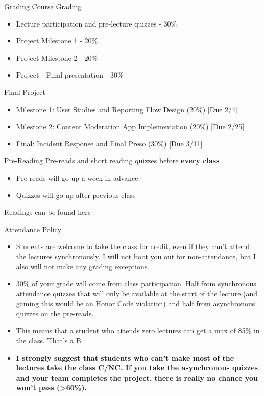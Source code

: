 \documentclass[nobackground,dvipsnames,table]{beamer}
\begin{document}
\begin{frame}{Grading}
    Course Grading
    \begin{itemize}
        \item Lecture participation and pre-lecture quizzes - 30\%
        \item Project Milestone 1 - 20\%
        \item Project Milestone 2 - 20\%
        \item Project - Final presentation - 30\% \newline
    \end{itemize}
    
    Final Project
    \begin{itemize}
        \item Milestone 1: User Studies and Reporting Flow Design (20\%) [Due 2/4]
        \item Milestone 2: Content Moderation App Implementation (20\%) [Due 2/25]
        \item Final:  Incident Response and Final Preso (30\%) [Due 3/11]
    \end{itemize}
\end{frame}

\begin{frame}{Pre-Reading}
    Pre-reads and short reading quizzes before \bfseries every \mdseries class
    \begin{itemize}
        \item Pre-reads will go up a week in advance
        \item Quizzes will go up after previous class
    \end{itemize}
    Readings can be found here %
\end{frame}

\begin{frame}{Attendance Policy}
    \begin{itemize}
        \item Students are welcome to take the class for credit, even if they can't attend the lectures synchronously. I will not boot you out for non-attendance, but I also will not make any grading exceptions.
        \item 30\% of your grade will come from class participation. Half from synchronous attendance quizzes that will only be available at the start of the lecture (and gaming this would be an Honor Code violation) and half from asynchronous quizzes on the pre-reads.
        \item This means that a student who attends zero lectures can get a max of 85\% in the class. That's a B. 
        \item \bfseries I strongly suggest that students who can't make most of the lectures take the class C/NC. \mdseries
        If you take the asynchronous quizzes and your team completes the project, there is really no chance you won't pass (>60\%).
    \end{itemize}
\end{frame}
\end{document}
